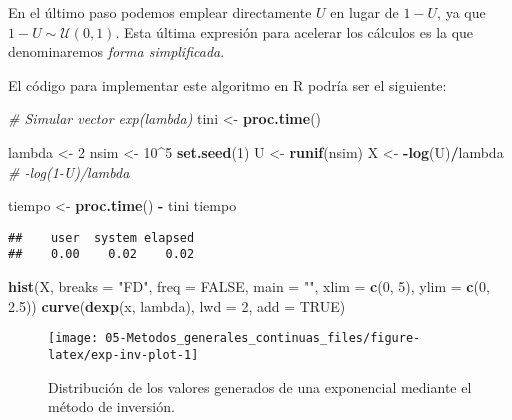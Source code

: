 \documentclass[
]{book}
\newenvironment{Shaded}{\begin{snugshade}}{\end{snugshade}}
\newcommand{\CommentTok}[1]{\textcolor[rgb]{0.56,0.35,0.01}{\textit{#1}}}
\newcommand{\DataTypeTok}[1]{\textcolor[rgb]{0.13,0.29,0.53}{#1}}
\newcommand{\DecValTok}[1]{\textcolor[rgb]{0.00,0.00,0.81}{#1}}
\newcommand{\FloatTok}[1]{\textcolor[rgb]{0.00,0.00,0.81}{#1}}
\newcommand{\KeywordTok}[1]{\textcolor[rgb]{0.13,0.29,0.53}{\textbf{#1}}}
\newcommand{\NormalTok}[1]{#1}
\newcommand{\OperatorTok}[1]{\textcolor[rgb]{0.81,0.36,0.00}{\textbf{#1}}}
\newcommand{\OtherTok}[1]{\textcolor[rgb]{0.56,0.35,0.01}{#1}}
\newcommand{\StringTok}[1]{\textcolor[rgb]{0.31,0.60,0.02}{#1}}
\theoremstyle{break}
\theoremstyle{definition}
\theoremstyle{definition}
\theoremstyle{definition}
\theoremstyle{remark}
\begin{document}
En el último paso podemos emplear directamente \(U\) en lugar de \(1-U\), ya que \(1 - U\sim \mathcal{U}\left( 0,1\right)\).
Esta última expresión para acelerar los cálculos es la que denominaremos \emph{forma simplificada}.

El código para implementar este algoritmo en R podría ser el siguiente:

\begin{Shaded}
\begin{Highlighting}[]
\CommentTok{# Simular vector exp(lambda)}
\NormalTok{tini <-}\StringTok{ }\KeywordTok{proc.time}\NormalTok{()}

\NormalTok{lambda <-}\StringTok{ }\DecValTok{2}
\NormalTok{nsim <-}\StringTok{ }\DecValTok{10}\OperatorTok{^}\DecValTok{5}
\KeywordTok{set.seed}\NormalTok{(}\DecValTok{1}\NormalTok{)}
\NormalTok{U <-}\StringTok{ }\KeywordTok{runif}\NormalTok{(nsim)}
\NormalTok{X <-}\StringTok{ }\OperatorTok{-}\KeywordTok{log}\NormalTok{(U)}\OperatorTok{/}\NormalTok{lambda }\CommentTok{# -log(1-U)/lambda}

\NormalTok{tiempo <-}\StringTok{ }\KeywordTok{proc.time}\NormalTok{() }\OperatorTok{-}\StringTok{ }\NormalTok{tini}
\NormalTok{tiempo}
\end{Highlighting}
\end{Shaded}

\begin{verbatim}
##    user  system elapsed 
##    0.00    0.02    0.02
\end{verbatim}

\begin{Shaded}
\begin{Highlighting}[]
\KeywordTok{hist}\NormalTok{(X, }\DataTypeTok{breaks =} \StringTok{"FD"}\NormalTok{, }\DataTypeTok{freq =} \OtherTok{FALSE}\NormalTok{, }
        \DataTypeTok{main =} \StringTok{""}\NormalTok{, }\DataTypeTok{xlim =} \KeywordTok{c}\NormalTok{(}\DecValTok{0}\NormalTok{, }\DecValTok{5}\NormalTok{), }\DataTypeTok{ylim =} \KeywordTok{c}\NormalTok{(}\DecValTok{0}\NormalTok{, }\FloatTok{2.5}\NormalTok{))}
\KeywordTok{curve}\NormalTok{(}\KeywordTok{dexp}\NormalTok{(x, lambda), }\DataTypeTok{lwd =} \DecValTok{2}\NormalTok{, }\DataTypeTok{add =} \OtherTok{TRUE}\NormalTok{)}
\end{Highlighting}
\end{Shaded}

\begin{figure}[!htb]

{\centering \texttt{[image: 05-Metodos\_generales\_continuas\_files/figure-latex/exp-inv-plot-1]} 

}

\caption{Distribución de los valores generados de una exponencial mediante el método de inversión.}\label{fig:exp-inv-plot}
\end{figure}
\end{document}
